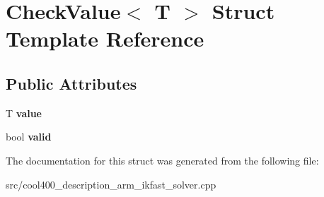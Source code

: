 \section{Check\-Value$<$ T $>$ Struct Template Reference}
\label{struct_check_value}
\subsection*{Public Attributes}
\begin{DoxyCompactItemize}
\item 
T {\bfseries value}\label{struct_check_value_a96d0c95abbb5c848c92f09df55d253a1}

\item 
bool {\bfseries valid}\label{struct_check_value_a3be5a3feb4357bf37b01eef7fd5cc767}

\end{DoxyCompactItemize}


The documentation for this struct was generated from the following file\-:\begin{DoxyCompactItemize}
\item 
src/cool400\-\_\-description\-\_\-arm\-\_\-ikfast\-\_\-solver.\-cpp\end{DoxyCompactItemize}
